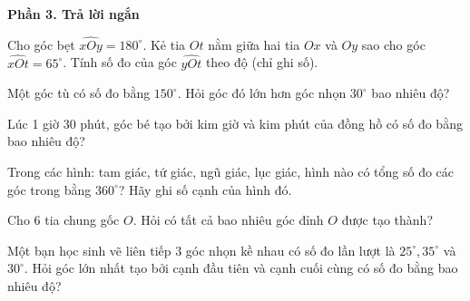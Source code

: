 \textbf{Phần 3. Trả lời ngắn}

\begin{ex} %
Cho góc bẹt $\widehat{xOy} = 180^\circ$. Kẻ tia $Ot$ nằm giữa hai tia $Ox$ và $Oy$ sao cho góc $\widehat{xOt} = 65^\circ$. Tính số đo của góc $\widehat{yOt}$ theo độ (chỉ ghi số).
\end{ex}

\begin{ex} %
Một góc tù có số đo bằng $150^\circ$. Hỏi góc đó lớn hơn góc nhọn $30^\circ$ bao nhiêu độ?
\end{ex}

\begin{ex} %
Lúc 1 giờ 30 phút, góc bé tạo bởi kim giờ và kim phút của đồng hồ có số đo bằng bao nhiêu độ?
\end{ex}

\begin{ex} %
Trong các hình: tam giác, tứ giác, ngũ giác, lục giác, hình nào có tổng số đo các góc trong bằng $360^\circ$? Hãy ghi số cạnh của hình đó.
\end{ex}

\begin{ex} %
Cho $6$ tia chung gốc $O$. Hỏi có tất cả bao nhiêu góc đỉnh $O$ được tạo thành?
\end{ex}

\begin{ex} %
Một bạn học sinh vẽ liên tiếp 3 góc nhọn kề nhau có số đo lần lượt là $25^\circ, 35^\circ$ và $30^\circ$. Hỏi góc lớn nhất tạo bởi cạnh đầu tiên và cạnh cuối cùng có số đo bằng bao nhiêu độ?
\end{ex}

